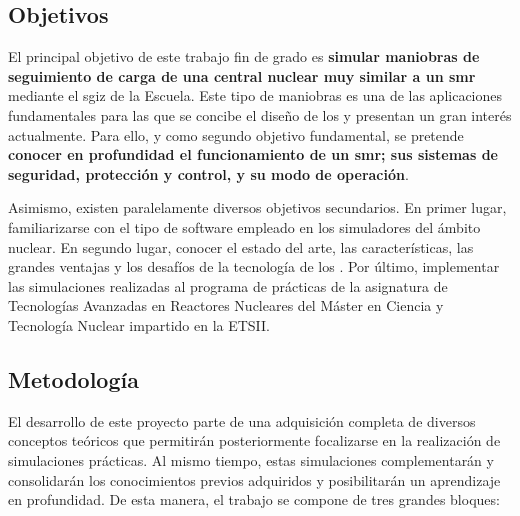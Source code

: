 \subsection{Objetivos}

El principal objetivo de este trabajo fin de grado es \textbf{simular maniobras de seguimiento de carga de una central nuclear muy similar a un \acrshort{smr}} mediante el \acrshort{sgiz} de la Escuela. Este tipo de maniobras es una de las aplicaciones fundamentales para las que se concibe el diseño de los  y presentan un gran interés actualmente. Para ello, y como segundo objetivo fundamental, se pretende \textbf{conocer en profundidad el funcionamiento de un \acrshort{smr}; sus sistemas de seguridad, protección y control, y su modo de operación}.

Asimismo, existen paralelamente diversos objetivos secundarios. En primer lugar, familiarizarse con el tipo de software empleado en los simuladores del ámbito nuclear. En segundo lugar, conocer el estado del arte, las características, las grandes ventajas y los desafíos de la tecnología de los . Por último, implementar las simulaciones realizadas al programa de prácticas de la asignatura de Tecnologías Avanzadas en Reactores Nucleares del Máster en Ciencia y Tecnología Nuclear impartido en la ETSII.

\subsection{Metodología}

El desarrollo de este proyecto parte de una adquisición completa de diversos conceptos teóricos que permitirán posteriormente focalizarse en la realización de simulaciones prácticas. Al mismo tiempo, estas simulaciones complementarán y consolidarán los conocimientos previos adquiridos y posibilitarán un aprendizaje en profundidad. De esta manera, el trabajo se compone de tres grandes bloques:

